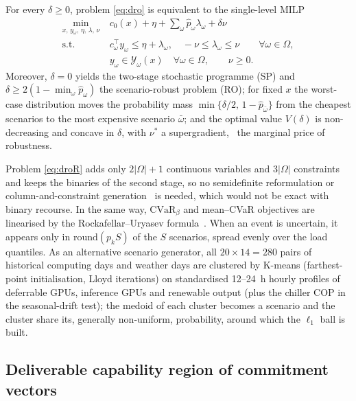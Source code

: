 \begin{proposition}\label{prop:dro}
For every $\delta\ge0$, problem \eqref{eq:dro} is equivalent to the single-level MILP
\begin{equation}
\begin{aligned}
\min_{x,\,y_\omega,\,\eta,\,\lambda,\,\nu}\ & c_0(x)+\eta+\sum_\omega\hat p_\omega\lambda_\omega+\delta\nu\\
\text{s.t.}\ & c_\omega^\top y_\omega\le\eta+\lambda_\omega,\quad -\nu\le\lambda_\omega\le\nu\qquad\forall\omega\in\Omega,\\
& y_\omega\in\mathcal Y_\omega(x)\quad\forall\omega\in\Omega,\qquad \nu\ge0.
\end{aligned}
\label{eq:droR}
\end{equation}
Moreover, $\delta=0$ yields the two-stage stochastic programme (SP) and $\delta\ge2(1-\min_\omega\hat p_\omega)$ the
scenario-robust problem (RO); for fixed $x$ the worst-case distribution moves the probability mass
$\min\{\delta/2,\,1-\hat p_{\bar\omega}\}$ from the cheapest scenarios to the most expensive scenario $\bar\omega$; and the
optimal value $V(\delta)$ is non-decreasing and concave in $\delta$, with $\nu^*$ a supergradient, \ie\ the marginal
price of robustness.
\end{proposition}

Problem \eqref{eq:droR} adds only $2|\Omega|+1$ continuous variables and $3|\Omega|$ constraints and keeps the binaries
of the second stage, so no semidefinite reformulation or column-and-constraint generation~\cite{zhang2026bilevel,zeng2013}
is needed, which would not be exact with binary recourse. In the same way, $\mathrm{CVaR}_\beta$ and mean--CVaR
objectives are linearised by the Rockafellar--Uryasev formula~\cite{rockafellar2000}. When an event is uncertain, it
appears only in $\mathrm{round}(p_kS)$ of the $S$ scenarios, spread evenly over the load quantiles. As an alternative
scenario generator, all $20\times14=280$ pairs of historical computing days and weather days are clustered by K-means (farthest-point
initialisation, Lloyd iterations) on standardised 12--24~h hourly profiles of deferrable GPUs, inference GPUs and
renewable output (plus the chiller COP in the seasonal-drift test); the medoid of each cluster becomes a scenario and
the cluster share its, generally non-uniform, probability, around which the $\ell_1$ ball is built.

\subsection{Deliverable capability region of commitment vectors}
\label{sec:region}

